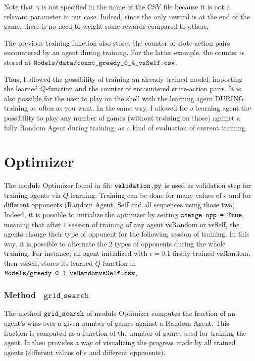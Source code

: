 \documentclass{article}
\begin{document}
Note that $\gamma$ is not specified in the name of the CSV file because it is not a relevant parameter in our case. Indeed, since the only reward is at the end of the game, there is no need to weight some rewards compared to others.

The previous training function also stores the counter of state-action pairs encountered by an agent during training. For the latter example, the counter is stored at $\verb|Models/data/count_greedy_0_4_vsSelf.csv|$.

Thus, I allowed the possibility of training an already trained model, importing the learned $Q$-function and the counter of encountered state-action pairs. It is also possible for the user to play on the shell with the learning agent DURING training as often as you want. In the same way, I allowed for a learning agent the possibility to play any number of games (without training on those) against a fully Random Agent during training, as a kind of evaluation of current training.

\section{Optimizer}

The module Optimizer found in file $\verb|validation.py|$ is used as validation step for training agents via $Q$-learning. Training can be done for many values of $\epsilon$ and for different opponents (Random Agent, Self and all sequences using those two). Indeed, it is possible to initialize the optimizer by setting $\verb|change_opp = True|$, meaning that after $1$ session of training of any agent vsRandom or vsSelf, the agents change their type of opponent for the following session of training. In this way, it is possible to alternate the $2$ types of opponents during the whole training. For instance, an agent initialized with $\epsilon = 0.1$ firstly trained vsRandom, then vsSelf, stores its learned $Q$-function in $\verb|Models/greedy_0_1_vsRandomvsSelf.csv|$.

\subsubsection*{Method \ $\mathtt{grid\_search}$}

The method $\verb|grid_search|$ of module Optimizer computes the fraction of an agent's wins over a given number of games against a Random Agent. This fraction is computed as a function of the number of games used for training the agent. It then provides a way of visualizing the progress made by all trained agents (different values of $\epsilon$ and different opponents). 
\end{document}
